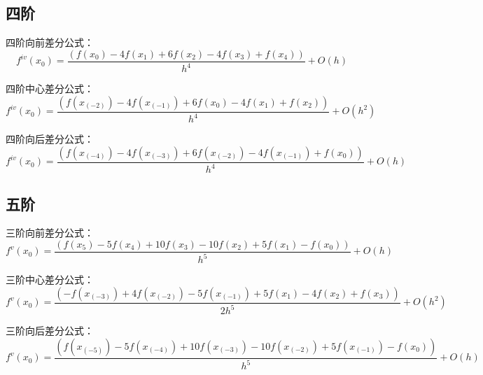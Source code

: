 \documentclass[UTF8]{ctexart}
\begin{document}
    \subsection{四阶}\label{subsec:1.3}


    四阶向前差分公式：
    \begin{equation*}
        f^{iv} (x_0 ) = \frac{(f(x_0 ) - 4f(x_1 ) + 6f(x_2 ) - 4f(x_3 ) + f(x_4))}{h^4} +O(h)
    \end{equation*}

    四阶中心差分公式：
    \begin{equation*}
        f^{iv} (x_0 ) = \frac{(f(x_(-2) ) - 4f(x_(-1) ) + 6f(x_0) - 4f(x_1 ) + f(x_2 ))}{h^4} +O(h^2 )
    \end{equation*}

    四阶向后差分公式：
    \begin{equation*}
        f^{iv} (x_0 ) = \frac{(f(x_(-4)) - 4f(x_(-3) ) + 6f(x_(-2) ) - 4f(x_(-1) ) + f(x_0 ))}{h^4} +O(h)
    \end{equation*}


    \subsection{五阶}\label{subsec:1.4}

    三阶向前差分公式：
    \begin{equation*}
        f^v (x_0 ) = \frac{(f(x_5 ) - 5f(x_4 ) + 10f(x_3 ) - 10f(x_2 ) + 5f(x_1 ) - f(x_0))}{h^5} +O(h)
    \end{equation*}

    三阶中心差分公式：
    \begin{equation*}
        f^v (x_0 ) = \frac{(-f(x_(-3) ) + 4f(x_(-2) ) - 5f(x_(-1) ) + 5f(x_1 ) - 4f(x_2 ) + f(x_3))}{2h^5}+O(h^2 )
    \end{equation*}

    三阶向后差分公式：
    \begin{equation*}
        f^v (x_0 ) = \frac{(f(x_(-5) ) - 5f(x_(-4) ) + 10f(x_(-3) ) - 10f(x_(-2) ) + 5f(x_(-1) ) - f(x_0))}{h^5} +O(h)
    \end{equation*}

    \newpage
\end{document}

